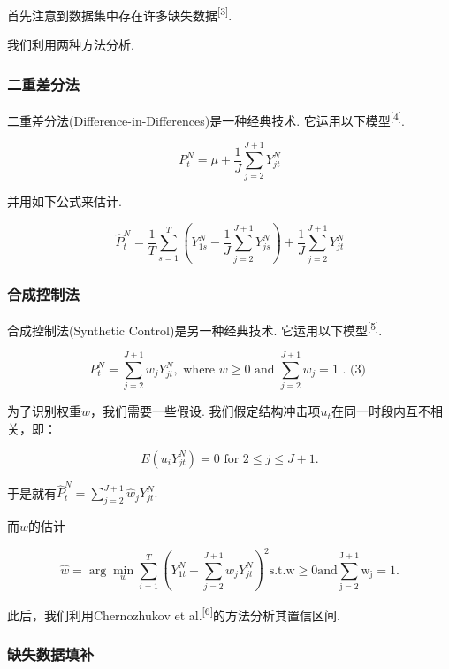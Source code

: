 \documentclass[]{ctexart}
\begin{document}
首先注意到数据集中存在许多缺失数据\textsuperscript{{[}3{]}}.

我们利用两种方法分析.

\hypertarget{ux4e8cux91cdux5deeux5206ux6cd5}{%
\subsubsection{二重差分法}\label{ux4e8cux91cdux5deeux5206ux6cd5}}

二重差分法(Difference-in-Differences)是一种经典技术.
它运用以下模型\textsuperscript{{[}4{]}}.

\[
P_{t}^{N}=\mu+\frac{1}{J} \sum_{j=2}^{J+1} Y_{j t}^{N}
\]

并用如下公式来估计.

\[
\hat{P}_{t}^{N}=\frac{1}{T} \sum_{s=1}^{T}\left(Y_{1 s}^{N}-\frac{1}{J} \sum_{j=2}^{J+1} Y_{j s}^{N}\right)+\frac{1}{J} \sum_{j=2}^{J+1} Y_{j t}^{N}
\]

\hypertarget{ux5408ux6210ux63a7ux5236ux6cd5}{%
\subsubsection{合成控制法}\label{ux5408ux6210ux63a7ux5236ux6cd5}}

合成控制法(Synthetic Control)是另一种经典技术.
它运用以下模型\textsuperscript{{[}5{]}}.

\[
P_{t}^{N}=\sum_{j=2}^{J+1} w_{j} Y_{j t}^{N}, \text { where } w \geq 0 \text { and } \sum_{j=2}^{J+1} w_{j}=1 \text { . (3) }
\]

为了识别权重\(w\)，我们需要一些假设.
我们假定结构冲击项\(u_{t}\)在同一时段内互不相关，即：

\[
E\left(u_{i} Y_{j t}^{N}\right)=0 \text { for } 2 \leq j \leq J+1 .
\]

于是就有\(\hat{P}_{t}^{N}=\sum_{j=2}^{J+1} \hat{w}_{j} Y_{j t}^{N} .\)

而\(w\)的估计

\[
\hat{w}=\arg \min _{w} \sum_{i=1}^{T}\left(Y_{1 t}^{N}-\sum_{j=2}^{J+1} w_{j} Y_{j t}^{N}\right)^{2}\text{s.t.}\mathrm{w}\geq 0\text{and}\sum_{\mathrm{j}=2}^{\mathrm{J}+1} \mathrm{w}_{\mathrm{j}}=1 .
\]

此后，我们利用Chernozhukov et
al.\textsuperscript{{[}6{]}}的方法分析其置信区间.

\hypertarget{ux7f3aux5931ux6570ux636eux586bux8865}{%
\subsubsection{缺失数据填补}\label{ux7f3aux5931ux6570ux636eux586bux8865}}
\end{document}
